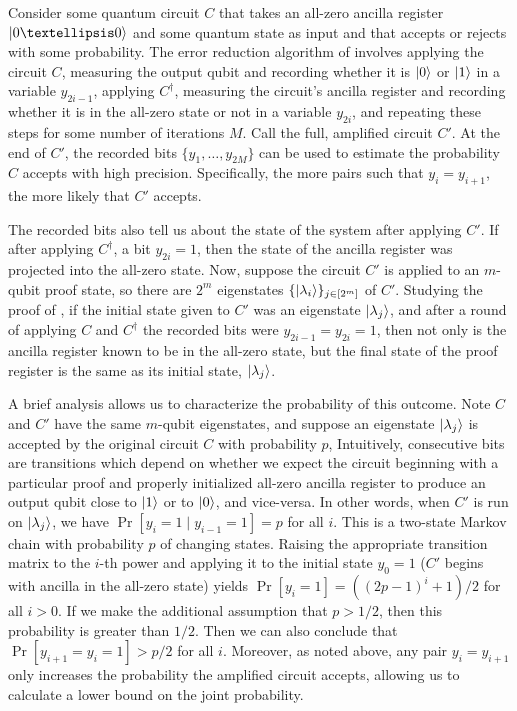 \documentclass[11pt]{article}
\numberwithin{equation}{section}
\theoremstyle{definition}
\theoremstyle{plain}
\begin{document}
Consider some quantum circuit $C$ that takes an all-zero ancilla register $\ket{0\dots 0}$ and some quantum state as input
and that accepts or rejects with some probability.
The error reduction algorithm of \cite{marriott2005quantum} involves
applying the circuit $C$,
measuring the output qubit and
recording whether it is $\ket{0}$ or $\ket{1}$ in a variable $y_{2i-1}$,
applying $C^{\dagger}$, 
measuring the circuit's ancilla register and
recording whether it is
in the all-zero
state or not in a variable $y_{2i}$, and repeating these steps for some number of
iterations $M$.
Call the full, amplified circuit $C'$.
At the end of $C'$, the recorded bits $\{y_1,\dots,y_{2M}\}$ can be used to estimate the probability $C$ accepts
with high precision. 
Specifically, the more pairs such that $y_i = y_{i+1}$, the more likely that $C'$ accepts.

The recorded bits also tell us about the state of the system after applying $C'$.
If after applying $C^\dagger$, a bit $y_{2i}=1$,
then the state of the ancilla register was projected into the all-zero state.
Now, suppose the circuit $C'$ is applied to an $m$-qubit proof state,
so there are $2^m$ eigenstates $\{\ket{\lambda_i}\}_{j\in [2^m]}$ of $C'$.
Studying the proof of \cite{marriott2005quantum},
if the initial state given to $C'$ was an eigenstate $\ket{\lambda_j}$,
and after a round of applying $C$ and $C^\dagger$ the recorded bits were $y_{2i-1}=y_{2i}=1$,
then not only is the ancilla register known to be in the all-zero state,
but the final state of the proof register is the same as its initial state,
$\ket{\lambda_j}$.

A brief analysis allows us to characterize the probability of this outcome.
Note $C$ and $C'$ have the same $m$-qubit eigenstates,
and suppose an eigenstate $\ket{\lambda_j}$ is accepted by the
original circuit $C$ with probability $p$,
Intuitively, consecutive bits are transitions which depend on whether we expect
the circuit beginning with a particular proof and properly initialized all-zero ancilla register to produce an output qubit close to $\ket{1}$ or to $\ket{0}$, and vice-versa.
In other words, when $C'$ is run on $\ket{\lambda_j}$,
we have $\Pr\left[y_{i}=1 \mid y_{i-1}=1\right] = p$ for all $i$.
This is a two-state Markov chain
with probability $p$ of changing states.
Raising the appropriate transition matrix to the $i$-th power
and applying it to the initial state $y_0=1$ ($C'$ begins with ancilla in the all-zero state) 
yields $\Pr\left[y_i=1\right] = \left(\left(2p-1\right)^i + 1\right)/2$ for all $i>0$.
If we make the additional assumption that $p>1/2$, then this probability is greater than $1/2$.
Then we can also conclude that $\Pr\left[y_{i+1}=y_i=1\right] > p/2$ for all $i$.
Moreover, as noted above,
any pair $y_{i}=y_{i+1}$ only increases the probability the amplified circuit accepts, allowing us to %
calculate a lower bound on the joint probability. %
\end{document}
